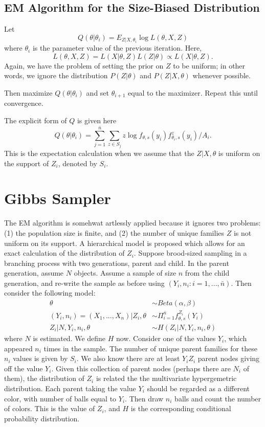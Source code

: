 \documentclass[11 pt]{article}
\renewcommand{\th}{\theta}
\newcommand{\fths}{f_{\th,s}}
\begin{document}
\subsection{EM Algorithm for the Size-Biased Distribution}

Let
\[
Q(\th | \th_i) = E_{Z|X,\th_i} \log L(\th,X,Z)
\]
where $\th_i$ is the parameter value of the previous iteration. Here,
\[
L(\th,X,Z) = L(X | \th, Z) L(Z | \th) \propto L(X | \th, Z).
\] 
Again, we have the problem of setting the prior on $Z$ to be uniform; in other words, we ignore the distribution $P(Z | \th)$ and $P(Z | X, \th)$ whenever possible.


Then maximize $Q(\th|\th_i)$ and set $\th_{i+1}$ equal to the maximizer. Repeat this until convergence.

The explicit form of $Q$ is given here
\[
Q(\th | \th_i) = \sum_{j=1}^{\bar{n}} \sum_{z \in S_j} z \log \fths (y_i) f^z_{\th_i,s}(y_i) / A_i.
\]
This is the expectation calculation when we assume that the $Z | X, \th$ is uniform on the support of $Z_i$, denoted by $S_i$.


\section{Gibbs Sampler}

The EM algorithm is somehwat artlessly applied because it ignores two problems: (1) the population size is finite, and (2) the number of unique families $Z$ is not uniform on its support. A hierarchical model is proposed which allows for an exact calculation of the distribution of $Z_i$. Suppose brood-sized sampling in a branching process with two generations, parent and child. In the parent generation, assume $N$ objects. Assume a sample of size $n$ from the child generation, and re-write the sample as before using $(Y_i,n_i : i=1,...,\bar{n})$. Then consider the following model:
\begin{align*}
\th &\sim Beta(\alpha, \beta) \\
(Y_i, n_i) = (X_1,...,X_n) | Z_i, \th &\sim \Pi_{i=1}^{\bar{n}} \fths^{Z_i}(Y_i) \\
Z_i | N, Y_i, n_i, \th &\sim H(Z_i | N, Y_i, n_i, \th)
\end{align*}
where $N$ is estimated. We define $H$ now. Consider one of the values $Y_i$, which appeared $n_i$ times in the sample. The number of unique parent families for these $n_i$ values is given by $S_i$. We also know there are at least $Y_i  Z_i$ parent nodes giving off the value $Y_i$. Given this collection of parent nodes (perhaps there are $N_i$ of them), the distribution of $Z_i$ is related the the multivariate hypergemetric distribution. Each parent taking the value $Y_i$ should be regarded as a different color, with number of balls equal to $Y_i$. Then draw $n_i$ balls and count the number of colors. This is the value of $Z_i$, and $H$ is the corresponding conditional probability distribution. 
\end{document}
